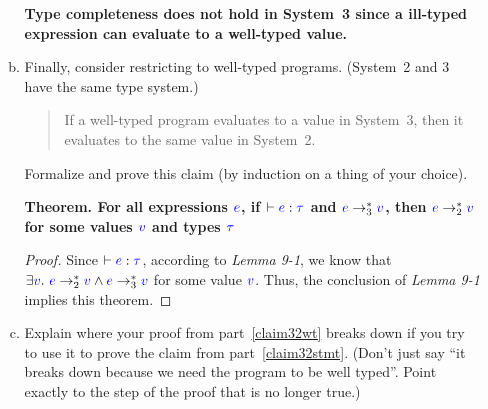 \documentclass{article}
\newcommand{\meta}[1]{{\color{blue}#1}}
\begin{document}
\begin{enumerate}[leftmargin=*,itemindent=*,start=6,label={{\bf Problem \arabic*}.},ref=\arabic*]
\begin{enumerate}[(a)]
    \textbf {
      Type completeness does not hold in System~3 since a ill-typed expression can evaluate to a well-typed value.      
    }

  \item\label{claim32wt} Finally, consider restricting to well-typed programs. (System~2 and 3 have the same type system.)
    \begin{quote}
      If a well-typed program evaluates to a value in System~3, then it evaluates to the same value in System~2.
    \end{quote}
    Formalize and prove this claim (by induction on a thing of your choice).

    \textbf{
      Theorem. For all expressions $\meta{e}$, if $\vdash \meta{e} : \meta{\tau}$ and $\meta{e} \to_3^* \meta{v}$, then $\meta{e} \to_2^* \meta{v}$ for some values $\meta{v}$ and types $\meta{\tau}$
    }
    \begin{proof}
      Since $\vdash \meta{e} : \meta{\tau}$, according to \textit{Lemma 9-1}, we know that $\exists \meta{v}.\ \meta{e} \to_2^* \meta{v} \wedge \meta{e} \to_3^* \meta{v}$ for some value $\meta{v}$. Thus, the conclusion of \textit{Lemma 9-1} implies this theorem.
    \end{proof}
      \item Explain where your proof from part~\ref{claim32wt} breaks down if you try to use it
    to prove the claim from part~\ref{claim32stmt}. (Don't just say ``it breaks down because
    we need the program to be well typed''. Point exactly to the step of the proof that is
    no longer true.)
  \end{enumerate}
\end{enumerate}
\end{document}
